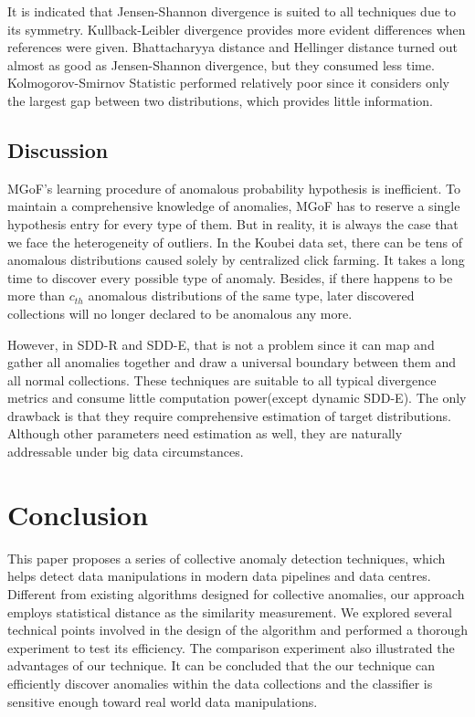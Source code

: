 \documentclass[10pt,conference,letterpaper]{article}
\begin{document}
			It is indicated that Jensen-Shannon divergence is suited to all techniques due to its symmetry. Kullback-Leibler divergence provides more evident differences when references were given. Bhattacharyya distance and Hellinger distance turned out almost as good as Jensen-Shannon divergence, but they consumed less time. Kolmogorov-Smirnov Statistic performed relatively poor since it considers only the largest gap between two distributions, which provides little information.
			
		\subsection{Discussion}
			MGoF's learning procedure of anomalous probability hypothesis is inefficient. To maintain a comprehensive knowledge of anomalies, MGoF has to reserve a single hypothesis entry for every type of them. But in reality, it is always the case that we face the heterogeneity of outliers. In the Koubei data set, there can be tens of anomalous distributions caused solely by centralized click farming. It takes a long time to discover every possible type of anomaly. Besides, if there happens to be more than $c_{th}$ anomalous distributions of the same type, later discovered collections will no longer declared to be anomalous any more.
			
			However, in SDD-R and SDD-E, that is not a problem since it can map and gather all anomalies together and draw a universal boundary between them and all normal collections. These techniques are suitable to all typical divergence metrics and consume little computation power(except dynamic SDD-E). The only drawback is that they require comprehensive estimation of target distributions. Although other parameters need estimation as well, they are naturally addressable under big data circumstances.
			
	\section{Conclusion}\label{sec:conclusion}
		This paper proposes a series of collective anomaly detection techniques, which helps detect data manipulations in modern data pipelines and data centres. Different from existing algorithms designed for collective anomalies, our approach employs statistical distance as the similarity measurement. We explored several technical points involved in the design of the algorithm and performed a thorough experiment to test its efficiency. The comparison experiment also illustrated the advantages of our technique. It can be concluded that the our technique can efficiently discover anomalies within the data collections and the classifier is sensitive enough toward real world data manipulations. 
		
\end{document}
